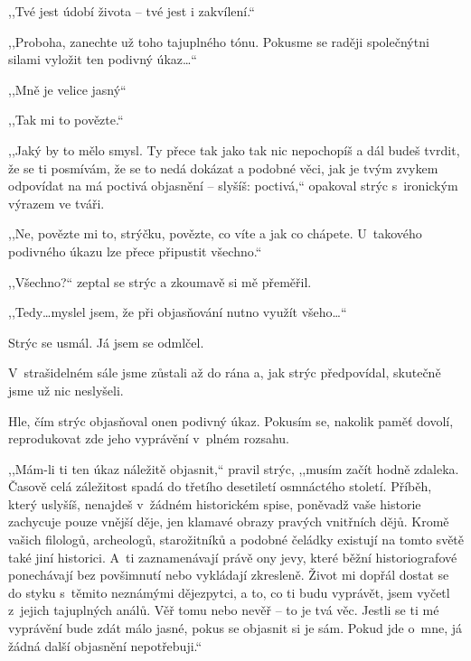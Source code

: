 ,,Tvé jest údobí života – tvé jest i zakvílení.``

,,Proboha, zanechte už toho tajuplného tónu. Pokusme se raději společnýtni silami vyložit ten podivný úkaz\ldots``

,,Mně je velice jasný``

,,Tak mi to povězte.``

,,Jaký by to mělo smysl. Ty přece tak jako tak nic nepochopíš a dál budeš tvrdit, že se ti posmívám, že se to nedá dokázat a podobné věci, jak je tvým zvykem odpovídat na má poctivá objasnění – slyšíš: poctivá,`` opakoval strýc s ironickým výrazem ve tváři.

,,Ne, povězte mi to, strýčku, povězte, co víte a jak co chápete. U~takového podivného úkazu lze přece připustit všechno.``

,,Všechno?`` zeptal se strýc a zkoumavě si mě přeměřil.

,,Tedy\ldots myslel jsem, že při objasňování nutno využít všeho\ldots``

Strýc se usmál. Já jsem se odmlčel.

V strašidelném sále jsme zůstali až do rána a, jak strýc předpovídal, skutečně jsme už nic neslyšeli.

Hle, čím strýc objasňoval onen podivný úkaz. Pokusím se, nakolik paměť dovolí, reprodukovat zde jeho vyprávění v plném rozsahu.

,,Mám-li ti ten úkaz náležitě objasnit,`` pravil strýc, ,,musím začít hodně zdaleka. Časově celá záležitost spadá do třetího desetiletí osmnáctého století. Příběh, který uslyšíš, nenajdeš v žádném historickém spise, poněvadž vaše historie zachycuje pouze vnější děje, jen klamavé obrazy pravých vnitřních dějů. Kromě vašich filologů, archeologů, starožitníků a podobné čeládky existují na tomto světě také jiní historici. A~ti zaznamenávají právě ony jevy, které běžní historiografové ponechávají bez povšimnutí nebo vykládají zkresleně. Život mi dopřál dostat se do styku s těmito neznámými dějezpytci, a to, co ti budu vyprávět, jsem vyčetl z jejich tajuplných análů. Věř tomu nebo nevěř – to je tvá věc. Jestli se ti mé vyprávění bude zdát málo jasné, pokus se objasnit si je sám. Pokud jde o~mne, já žádná další objasnění nepotřebuji.``

